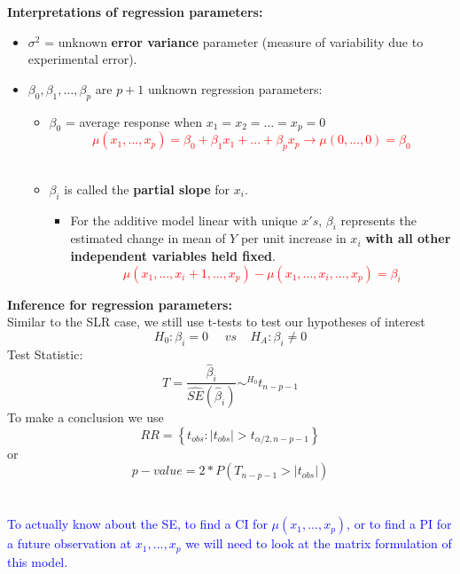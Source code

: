 \Large\textbf{Interpretations of regression parameters:}\large
\begin{itemize}
\item $\sigma^2$ = unknown \textbf{error variance} parameter (measure of variability due to experimental error). 
\item $\beta_0, \beta_1, \ldots, \beta_p$ are $p+1$ unknown regression parameters:
	\begin{itemize}
	\item $\beta_0$ = average response when $x_1 = x_2 = \ldots = x_p =0$ \\ %
	\textcolor{red}{$$\mu(x_1,...,x_p)=\beta_0+\beta_1x_{1}+...+\beta_px_{p} \rightarrow \mu(0,...,0)=\beta_0$$}~\\
	\item $\beta_i$ is called the \textbf{partial slope} for $x_i$. 
	\begin{itemize}
	\item For the additive model linear with unique $x's$, $\beta_i$ represents the estimated change in mean of $Y$ per unit increase in $x_i$ \textbf{with all other independent variables held fixed}. \\
	\textcolor{red}{$$\mu(x_1,...,x_{i}+1,...,x_p)-\mu(x_1,...,x_{i},...,x_p)=\beta_i$$}
\end{itemize}
\end{itemize}
\end{itemize}

\newpage

\Large\textbf{Inference for regression parameters:}\large\\
Similar to the SLR case, we still use t-tests to test our hypotheses of interest
$$H_0:\beta_i=0~~~~~~vs~~~~~H_A:\beta_i\neq 0$$
Test Statistic:
$$T=\frac{\hat{\beta}_i}{\hat{SE}(\hat{\beta}_i)}\sim^{H_0} t_{n-p-1}$$
To make a conclusion we use
$$RR=\left\{t_{obs}:|t_{obs}|>t_{\alpha/2,n-p-1}\right\}$$
or
$$p-value=2*P(T_{n-p-1}>|t_{obs}|)$$~\\~\\

\textcolor{blue}{To actually know about the SE, to find a CI for $\mu(x_1,...,x_p)$, or to find a PI for a future observation at $x_1,...,x_p$ we will need to look at the matrix formulation of this model.}

\newpage

